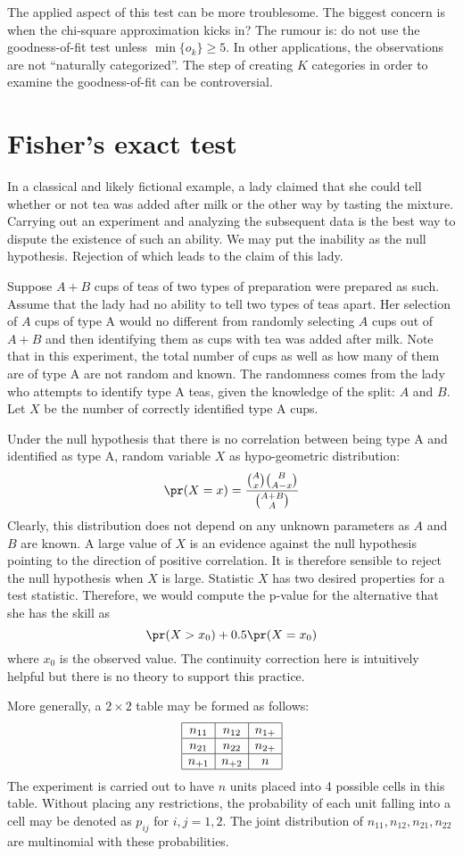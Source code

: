 The applied aspect of this test can be more troublesome. The biggest
concern is when the chi-square approximation kicks in? The rumour is:
do not use the goodness-of-fit test unless $\min \{ o_k\} \geq 5$.  
In other applications, the observations
are not ``naturally categorized''. The step of creating $K$ categories in order
to examine the goodness-of-fit can be controversial.


\section{Fisher's exact test}
In a classical and likely fictional example, a lady
claimed that she could tell whether or not
tea was added after milk or the other way by tasting the mixture.
Carrying out an experiment and analyzing the subsequent data
is the best way to dispute the existence of such an ability. 
We may put the inability as the null hypothesis.
Rejection of which leads to the claim of this lady.

Suppose $A + B$ cups of teas of two types of preparation
were prepared as such. Assume that
the lady had no ability to tell two types of teas apart.
Her selection of $A$ cups of type A would no different from
randomly selecting $A$ cups out of $A+B$ and then
identifying them as cups with tea was added after milk. 
Note that in this experiment, the
total number of cups as well as how many of them are of
type A are not random and known. The randomness comes from
the lady who attempts to identify type A teas, given the
knowledge of the split: $A$ and $B$.
Let $X$ be the number of correctly identified type A cups.

Under the null hypothesis that there is no correlation between
being type A and identified as type A, random variable $X$
as hypo-geometric distribution:
\[
\pr (X = x) = \frac{ {A \choose x} {B \choose A-x}}{ {A+B \choose A}}
\]
Clearly, this distribution does not depend on any unknown parameters
as $A$ and $B$ are known.
A large value of $X$ is an evidence against the null hypothesis
pointing to the direction of positive correlation.
It is therefore sensible to reject the null hypothesis when $X$ is large. 
Statistic $X$ has two desired properties for a test statistic.
Therefore, we would compute the p-value for the alternative
that she has the skill as
\[
\pr (X > x_0) + 0.5 \pr (X = x_0)
\]
where $x_0$ is the observed value. The continuity correction
here is intuitively helpful but there is no theory to support this
practice.

More generally, a $2 \times 2$ table may be formed as follows:
\[
\begin{array}{|c|c|c|}
\hline
n_{11} & n_{12} & n_{1+}\\
\hline
n_{21} & n_{22} & n_{2+}\\
\hline
n_{+1} & n_{+2} & n\\
\hline
\end{array}
\]
The experiment is carried out to have $n$ units placed into
4 possible cells in this table. Without placing any restrictions,
the probability of each unit falling into a cell may be denoted
as $p_{ij}$ for $i, j = 1, 2$. 
The joint distribution of $n_{11}, n_{12}, n_{21}, n_{22}$
are multinomial with these probabilities.

